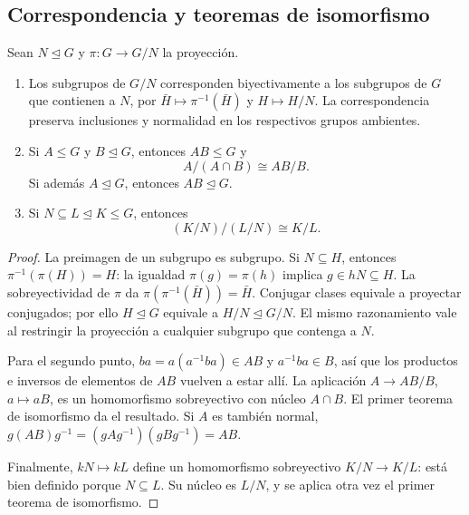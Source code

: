\subsection{Correspondencia y teoremas de isomorfismo}\label{tema:8-1-1b}
\begin{lema}\label{lema:C8-cocientes}
Sean $N\trianglelefteq G$ y $\pi:G\to G/N$ la proyección.
\begin{enumerate}
\item Los subgrupos de $G/N$ corresponden biyectivamente a los subgrupos de $G$ que contienen a $N$, por $\bar H\mapsto\pi^{-1}(\bar H)$ y $H\mapsto H/N$. La correspondencia preserva inclusiones y normalidad en los respectivos grupos ambientes.
\item Si $A\le G$ y $B\trianglelefteq G$, entonces $AB\le G$ y
\[
A/(A\cap B)\cong AB/B.
\]
Si además $A\trianglelefteq G$, entonces $AB\trianglelefteq G$.
\item Si $N\subseteq L\trianglelefteq K\le G$, entonces
\[
(K/N)/(L/N)\cong K/L.
\]
\end{enumerate}
\end{lema}
\begin{proof}
La preimagen de un subgrupo es subgrupo. Si $N\subseteq H$, entonces $\pi^{-1}(\pi(H))=H$: la igualdad $\pi(g)=\pi(h)$ implica $g\in hN\subseteq H$. La sobreyectividad de $\pi$ da $\pi(\pi^{-1}(\bar H))=\bar H$. Conjugar clases equivale a proyectar conjugados; por ello $H\trianglelefteq G$ equivale a $H/N\trianglelefteq G/N$. El mismo razonamiento vale al restringir la proyección a cualquier subgrupo que contenga a $N$.

Para el segundo punto, $ba=a(a^{-1}ba)\in AB$ y $a^{-1}ba\in B$, así que los productos e inversos de elementos de $AB$ vuelven a estar allí. La aplicación $A\to AB/B$, $a\mapsto aB$, es un homomorfismo sobreyectivo con núcleo $A\cap B$. El primer teorema de isomorfismo da el resultado. Si $A$ es también normal, $g(AB)g^{-1}=(gAg^{-1})(gBg^{-1})=AB$.

Finalmente, $kN\mapsto kL$ define un homomorfismo sobreyectivo $K/N\to K/L$: está bien definido porque $N\subseteq L$. Su núcleo es $L/N$, y se aplica otra vez el primer teorema de isomorfismo.
\end{proof}
